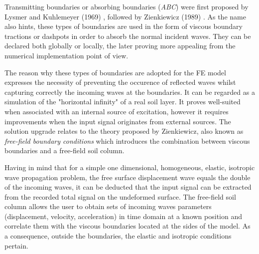 	Transmitting boundaries or absorbing boundaries (\textit{ABC}) were first proposed by Lysmer and Kuhlemeyer (1969) \cite{lysmer1969finite}, followed by Zienkiewicz (1989) \cite{zienkiewicz1989earthquake}. As the name also hints, these types of boundaries are used in the form of viscous boundary tractions or dashpots in order to absorb the normal incident waves. They can be declared both globally or locally, the later proving more appealing from the numerical implementation point of view.
	
	The reason why these types of boundaries are adopted for the FE model expresses the necessity of preventing the occurence of reflected waves whilst capturing correctly the incoming waves at the boundaries. It can be regarded as a simulation of the "horizontal infinity" of a real soil layer. It proves well-suited when associated with an internal source of excitation, however it requires improvements when the input signal originates from external sources. The solution upgrade relates to the theory proposed by Zienkiewicz, also known as \textit{free-field boundary conditions} which introduces the combination between viscous boundaries and a free-field soil column.
	
	Having in mind that for a simple one dimensional, homogeneous, elastic, isotropic wave propagation problem, the free surface displacement wave equals the double of the incoming waves, it can be deducted that the input signal can be extracted from the recorded total signal on the undeformed surface. The free-field soil column allows the user to obtain sets of incoming waves parameters (displacement, velocity, acceleration) in time domain at a known position and correlate them with the viscous boundaries located at the sides of the model. As a consequence, outside the boundaries, the elastic and isotropic conditions pertain.
	 
